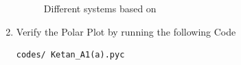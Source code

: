 \begin{enumerate}[label=\thesection.\arabic*.,ref=\thesection.\theenumi]
\begin{figure}
    \caption{Different systems based on \zeta}
    \label{fig:Graph}
\end{figure}
\item
Verify the Polar Plot by running the following Code\\
\begin{lstlisting}
codes/ Ketan_A1(a).pyc
\end{lstlisting}
\end{enumerate}
